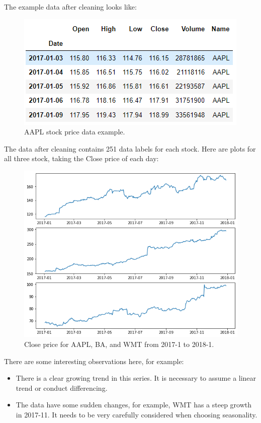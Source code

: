 \documentclass[11pt]{article}
\begin{document}
The example data after cleaning looks like:

\begin{figure}[h!]
\centerline{\includegraphics[scale=0.7]{ts_1.png}}
\caption{AAPL stock price data example.}
\end{figure}

The data after cleaning contains 251 data labels for each stock.
Here are plots for all three stock, taking the Close price of each day:

\begin{figure}[h!]
\centerline{\includegraphics[scale=0.7]{ts_2.png}}
\caption{Close price for AAPL, BA, and WMT from 2017-1 to 2018-1.}
\end{figure}

There are some interesting observations here, for example:
\begin{itemize}
\item There is a clear growing trend in this series. It is necessary to assume a linear trend or conduct differencing.
\item The data have some sudden changes, for example, WMT has a steep growth in 2017-11. It needs to be very carefully considered when choosing seasonality.
\end{itemize}
\end{document}
